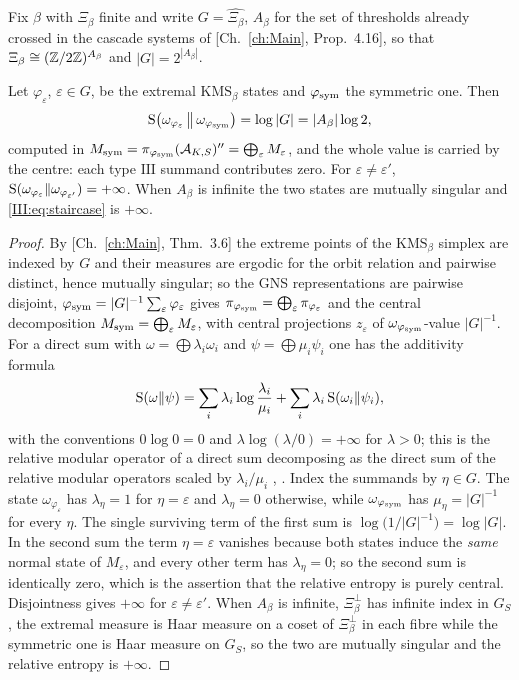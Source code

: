Fix $\beta$ with $\Xi_\beta$ finite and write $G=\widehat{\Xi_\beta}$, $A_\beta$ for the set
of thresholds already crossed in the cascade systems of [Ch.~\ref{ch:Main}, Prop.~4.16], so that
$\Xi_\beta\cong(\mathbb{Z}/2\mathbb{Z})^{A_\beta}$ and $|G|=2^{|A_\beta|}$.

\begin{theorem}\label{III:thm:staircase}
Let $\varphi_\varepsilon$, $\varepsilon\in G$, be the extremal $\mathrm{KMS}_\beta$ states
and $\varphi_{\mathrm{sym}}$ the symmetric one. Then
\begin{equation}\label{III:eq:staircase}
\mathrm{S}\bigl(\omega_{\varphi_\varepsilon}\,\big\|\,\omega_{\varphi_{\mathrm{sym}}}\bigr)=\log|G|=|A_\beta|\log2 ,
\end{equation}
computed in $M_{\mathrm{sym}}=\pi_{\varphi_{\mathrm{sym}}}(\mathcal{A}_{K,S})''=\bigoplus_{\varepsilon}M_\varepsilon$, and the
whole value is carried by the centre: each type $\mathrm{III}$ summand contributes zero. For
$\varepsilon\ne\varepsilon'$, $\mathrm{S}(\omega_{\varphi_\varepsilon}\|\omega_{\varphi_{\varepsilon'}})=+\infty$.
When $A_\beta$ is infinite the two states are mutually singular and \eqref{III:eq:staircase} is
$+\infty$.
\end{theorem}

\begin{proof}
By [Ch.~\ref{ch:Main}, Thm.~3.6] the extreme points of the $\mathrm{KMS}_\beta$ simplex are indexed
by $G$ and their measures are ergodic for the orbit relation and pairwise distinct, hence
mutually singular; so the GNS representations are pairwise disjoint, $\varphi_{\mathrm{sym}}=|G|^{-1}\sum_\varepsilon\varphi_\varepsilon$
gives $\pi_{\varphi_{\mathrm{sym}}}=\bigoplus_\varepsilon\pi_{\varphi_\varepsilon}$ and the central
decomposition $M_{\mathrm{sym}}=\bigoplus_\varepsilon M_\varepsilon$, with central projections
$z_\varepsilon$ of $\omega_{\varphi_{\mathrm{sym}}}$-value $|G|^{-1}$. For a direct sum with $\omega=\bigoplus\lambda_i\omega_i$ and
$\psi=\bigoplus\mu_i\psi_i$ one has the additivity formula
\[
\mathrm{S}(\omega\|\psi)=\sum_i\lambda_i\log\frac{\lambda_i}{\mu_i}+\sum_i\lambda_i\,\mathrm{S}(\omega_i\|\psi_i),
\]
with the conventions $0\log0=0$ and $\lambda\log(\lambda/0)=+\infty$ for $\lambda>0$; this is
the relative modular operator of a direct sum decomposing as the direct sum of the relative
modular operators scaled by $\lambda_i/\mu_i$ \cite{Araki}, \cite{OP}.
Index the summands by $\eta\in G$. The state $\omega_{\varphi_\varepsilon}$ has
$\lambda_\eta=1$ for $\eta=\varepsilon$ and $\lambda_\eta=0$ otherwise, while
$\omega_{\varphi_{\mathrm{sym}}}$ has $\mu_\eta=|G|^{-1}$ for every $\eta$. The single surviving term of
the first sum is $\log\bigl(1/|G|^{-1}\bigr)=\log|G|$. In the second sum the term
$\eta=\varepsilon$ vanishes because both states induce the \emph{same} normal state of
$M_\varepsilon$, and every other term has $\lambda_\eta=0$; so the second sum is identically
zero, which is the assertion that the relative entropy is purely central. Disjointness gives
$+\infty$ for $\varepsilon\ne\varepsilon'$. When $A_\beta$ is infinite, $\Xi_\beta^\perp$
has infinite index in $G_S$, the extremal measure is Haar measure on a coset of
$\Xi_\beta^\perp$ in each fibre while the symmetric one is Haar measure on $G_S$, so the two
are mutually singular and the relative entropy is $+\infty$.
\end{proof}

